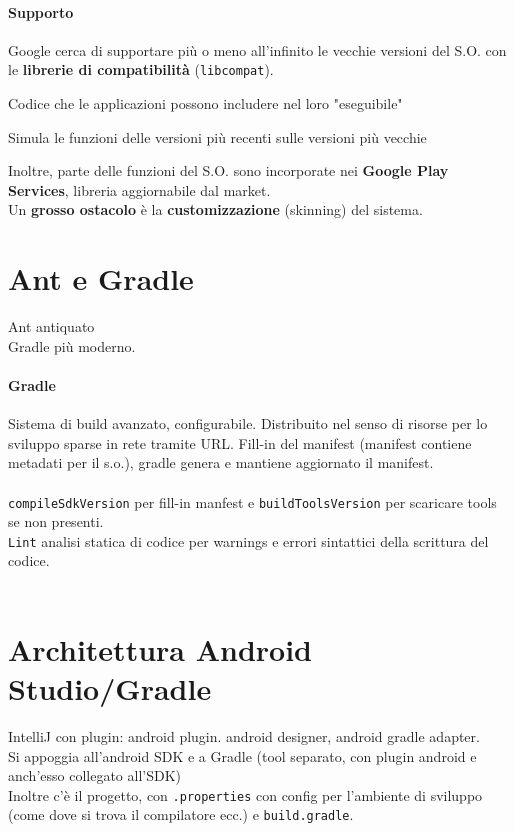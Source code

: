 \documentclass[10pt]{book}
\begin{document}
\paragraph{Supporto} Google cerca di supportare più o meno all'infinito le vecchie versioni del S.O. con le \textbf{librerie di compatibilità} (\texttt{libcompat}).
\begin{list}{}{}
	\item Codice che le applicazioni possono includere nel loro "eseguibile"
	\item Simula le funzioni delle versioni più recenti sulle versioni più vecchie
\end{list}
Inoltre, parte delle funzioni del S.O. sono incorporate nei \textbf{Google Play Services}, libreria aggiornabile dal market.\\
Un \textbf{grosso ostacolo} è la \textbf{customizzazione} (skinning) del sistema.

\section{Ant e Gradle}
Ant antiquato\\
Gradle più moderno.
\paragraph{Gradle} Sistema di build avanzato, configurabile. Distribuito nel senso di risorse per lo sviluppo sparse in rete tramite URL. Fill-in del manifest (manifest contiene metadati per il s.o.), gradle genera e mantiene aggiornato il manifest.\\
\\
\texttt{compileSdkVersion} per fill-in manfest e \texttt{buildToolsVersion} per scaricare tools se non presenti.\\
\texttt{Lint} analisi statica di codice per warnings e errori sintattici della scrittura del codice.\\\\
\section{Architettura Android Studio/Gradle}
IntelliJ con plugin: android plugin. android designer, android gradle adapter.\\
Si appoggia all'android SDK e a Gradle (tool separato, con plugin android e anch'esso collegato all'SDK)\\
Inoltre c'è il progetto, con \texttt{.properties} con config per l'ambiente di sviluppo (come dove si trova il compilatore ecc.) e \texttt{build.gradle}.
\end{document}
